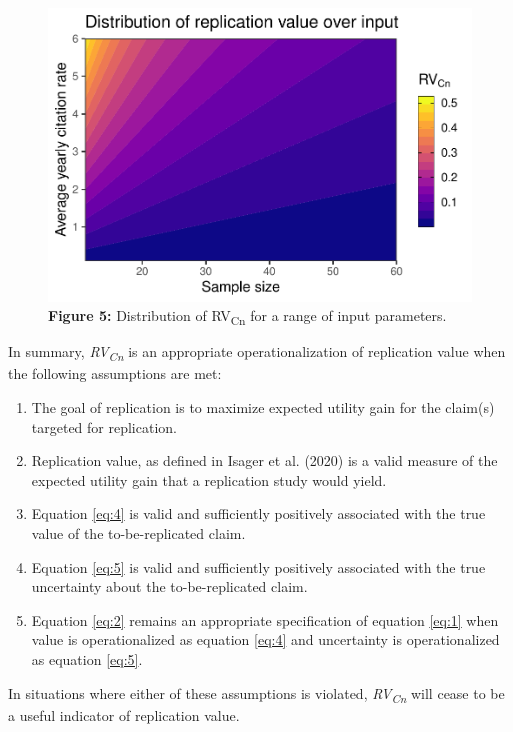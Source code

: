 \documentclass[
  english,
  jou,floatsintext]{apa6}
\providecommand{\tightlist}{%
  \setlength{\itemsep}{0pt}\setlength{\parskip}{0pt}}
\begin{document}
\begin{figure}
\centering
\includegraphics{RVcn_manuscript_files/figure-latex/5-1.pdf}
\caption{\label{fig:5}\textbf{Figure 5:} Distribution of RV\textsubscript{Cn} for a range of input parameters.}
\end{figure}

In summary, \emph{RV\textsubscript{Cn}} is an appropriate operationalization of replication value when the following assumptions are met:

\begin{enumerate}
\def\labelenumi{\arabic{enumi}.}
\tightlist
\item
  The goal of replication is to maximize expected utility gain for the claim(s) targeted for replication.
\item
  Replication value, as defined in Isager et al. (2020) is a valid measure of the expected utility gain that a replication study would yield.
\item
  Equation \eqref{eq:4} is valid and sufficiently positively associated with the true value of the to-be-replicated claim.
\item
  Equation \eqref{eq:5} is valid and sufficiently positively associated with the true uncertainty about the to-be-replicated claim.
\item
  Equation \eqref{eq:2} remains an appropriate specification of equation \eqref{eq:1} when value is operationalized as equation \eqref{eq:4} and uncertainty is operationalized as equation \eqref{eq:5}.
\end{enumerate}

In situations where either of these assumptions is violated, \emph{RV\textsubscript{Cn}} will cease to be a useful indicator of replication value.
\end{document}

